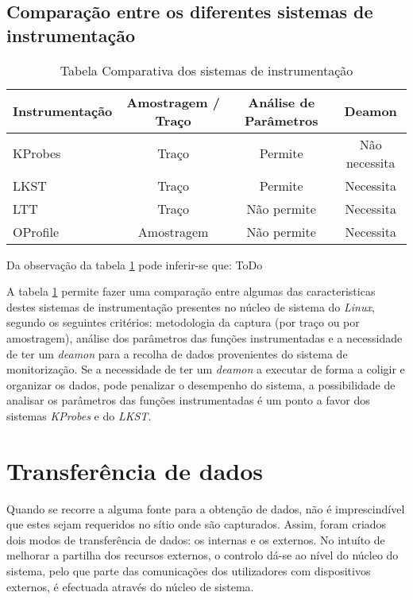 \subsection{Comparação entre os diferentes sistemas de instrumentação}
\begin{table}[h!]
\begin{center}
\caption{Tabela Comparativa dos sistemas de instrumentação}
\label{tab:inst_compare}
\begin{tabular}{|l||c|c|c|}
\hline
Instrumentação & Amostragem / Traço & Análise de Parâmetros & Deamon \\
\hline
KProbes & Traço & Permite & Não necessita \\
\hline
LKST & Traço & Permite & Necessita \\
\hline
LTT & Traço & Não permite & Necessita \\
\hline
OProfile & Amostragem & Não permite & Necessita \\
\hline

\end{tabular}
\end{center}
\end{table}

Da observação da tabela \ref{tab:inst_compare} pode inferir-se que: ToDo

A tabela \ref{tab:inst_compare} permite fazer uma comparação entre algumas das caracteristicas destes sistemas de instrumentação presentes no núcleo de sistema do \textit{Linux}, segundo os seguintes critérios: metodologia da captura (por traço ou por amostragem), análise dos parâmetros das funções instrumentadas e a necessidade de ter um \textit{deamon} para a recolha de dados provenientes do sistema de monitorização.
Se a necessidade de ter um \textit{deamon} a executar de forma a coligir e organizar os dados, pode penalizar o desempenho do sistema, a possibilidade de analisar os parâmetros das funções instrumentadas é um ponto a favor dos sistemas \textit{KProbes} e do \textit{LKST}.
\section{Transferência de dados}
\label{sect:kernel_user_comm}

Quando se recorre a alguma fonte para a obtenção de dados, não é imprescindível que estes sejam requeridos no sítio onde são capturados.
Assim, foram criados dois modos de transferência de dados: os internas e os externos.
No intuíto de melhorar a partilha dos recursos externos, o controlo dá-se ao nível do núcleo do sistema, pelo que parte das comunicações dos utilizadores com dispositivos externos, é efectuada através do núcleo de sistema.

